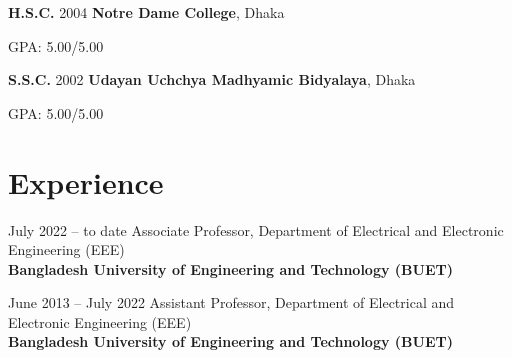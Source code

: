 \documentclass[cvauthor={Dr. Sajid Muhaimin Choudhury}]{buetcv}
\begin{document}
        \begin{threecolentry}{\textbf{H.S.C.}}{
            2004
        }
            \textbf{Notre Dame College}, Dhaka 
            \begin{highlights}
                \item GPA: 5.00/5.00 
            \end{highlights}
        \end{threecolentry}
        \begin{threecolentry}{\textbf{S.S.C.}}{
            2002
        }
            \textbf{Udayan Uchchya Madhyamic Bidyalaya}, Dhaka 
            \begin{highlights}
                \item GPA: 5.00/5.00 
            \end{highlights}
        \end{threecolentry}        


    
\section{Experience}
        \begin{twocolentry}{
        July 2022 – to date 
        }
        Associate Professor, Department of Electrical and Electronic Engineering (EEE) \\ \textbf{Bangladesh University of Engineering and Technology (BUET)} \\
        \end{twocolentry}
        \vspace{0.2 cm}
        \begin{twocolentry}{
            June 2013 – July 2022
            }
            Assistant Professor, Department of Electrical and Electronic Engineering (EEE) \\ \textbf{Bangladesh University of Engineering and Technology (BUET)} \\
        \end{twocolentry}
\end{document}
